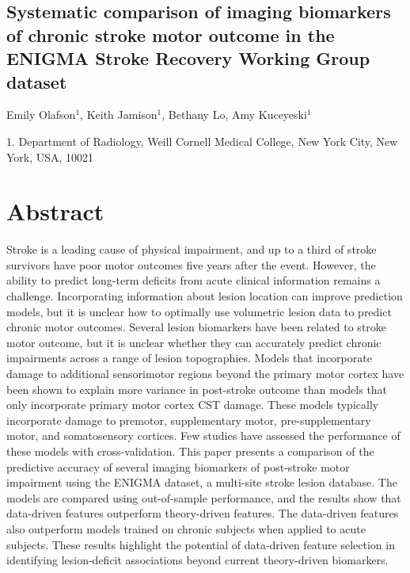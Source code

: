 \documentclass[10pt]{article}
\begin{document}
 

\begin{center}
{\large \section*{Systematic comparison of imaging biomarkers of chronic stroke motor outcome in the ENIGMA Stroke Recovery Working Group dataset}}
\end{center}

\begin{center}
Emily Olafson$^1$, Keith Jamison$^1$, Bethany Lo, Amy Kuceyeski$^1$
\end{center}

    1. \textmd{Department of Radiology, Weill Cornell Medical College, New York City, New York, USA, 10021} 


\section{Abstract}
Stroke is a leading cause of physical impairment, and up to a third of stroke survivors have poor motor outcomes five years after the event. However, the ability to predict long-term deficits from acute clinical information remains a challenge. Incorporating information about lesion location can improve prediction models, but it is unclear how to optimally use volumetric lesion data to predict chronic motor outcomes. Several lesion biomarkers have been related to stroke motor outcome, but it is unclear whether they can accurately predict chronic impairments across a range of lesion topographies. Models that incorporate damage to additional sensorimotor regions beyond the primary motor cortex have been shown to explain more variance in post-stroke outcome than models that only incorporate primary motor cortex CST damage. These models typically incorporate damage to premotor, supplementary motor, pre-supplementary motor, and somatosensory cortices. Few studies have assessed the performance of these models with cross-validation. This paper presents a comparison of the predictive accuracy of several imaging biomarkers of post-stroke motor impairment using the ENIGMA dataset, a multi-site stroke lesion database. The models are compared using out-of-sample performance, and the results show that data-driven features outperform theory-driven features. The data-driven features also outperform models trained on chronic subjects when applied to acute subjects. These results highlight the potential of data-driven feature selection in identifying lesion-deficit associations beyond current theory-driven biomarkers.
\end{document}
